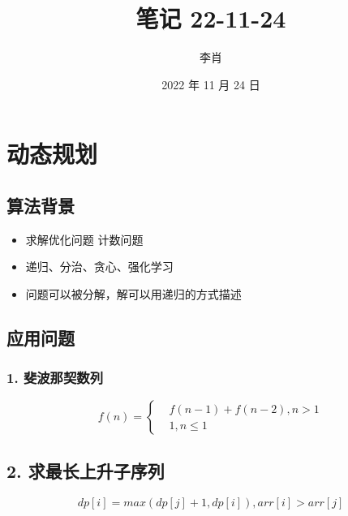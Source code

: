 \documentclass[UTF8]{ctexart}
\title{笔记 22-11-24}
\author{李肖}
\date{2022 年 11 月 24 日}
\begin{document}
\maketitle

\section*{动态规划}

\subsection*{算法背景}

\begin{itemize}
    \item 求解优化问题 计数问题
    \item 递归、分治、贪心、强化学习
    \item 问题可以被分解，解可以用递归的方式描述
\end{itemize}

\subsection*{应用问题}

\subsubsection*{1. 斐波那契数列}

\[
    f(n)=\left\{
    \begin{aligned}
         & f(n - 1) + f(n - 2), n > 1 \\
         & 1, n \le 1
    \end{aligned}
    \right.
\]

\subsection*{2. 求最长上升子序列}

\[dp[i] = max(dp[j] + 1, dp[i]), arr[i] > arr[j]\]
\end{document}
